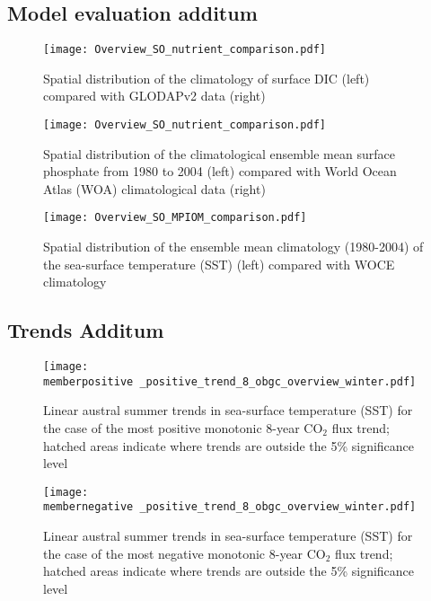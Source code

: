 \documentclass[12pt]{article}
\newcommand{\memberpositive}{m178_1985_1992} %
\newcommand{\membernegative}{m143_1995_2002}
\begin{document}
\clearpage
\subsection{Model evaluation additum}
\begin{figure}[h!]
	\centering
	\texttt{[image: Overview\_SO\_nutrient\_comparison.pdf]} %
	\caption{Spatial distribution of the climatology of surface DIC (left) compared with GLODAPv2 data \citep{WOA2013} (right)}
	\label{fig:SOCS_comp_DIC}
\end{figure}



\begin{figure}[h!]
	\centering
	\texttt{[image: Overview\_SO\_nutrient\_comparison.pdf]} %
	\caption{Spatial distribution of the climatological ensemble mean surface phosphate from 1980 to 2004 (left) compared with World Ocean Atlas (WOA) climatological data \citep{WOA2013} (right)}		
	\label{fig:SO_comp_phosph}
\end{figure}

\begin{figure}[h!]
	\centering
	\texttt{[image: Overview\_SO\_MPIOM\_comparison.pdf]} %
	\caption{Spatial distribution of the ensemble mean climatology (1980-2004) of the sea-surface temperature (SST) (left) compared with WOCE climatology}
	\label{fig:SO_comp_sst}
\end{figure}

\clearpage
\subsection{Trends Additum}
\begin{figure}[h!]
	\centering
	\texttt{[image: \\memberpositive \_positive\_trend\_8\_obgc\_overview\_winter.pdf]} %
	\caption{Linear austral summer trends in sea-surface temperature (SST) for the case of the most positive monotonic 8-year CO$_2$ flux trend; hatched areas indicate where trends are outside the 5\% significance level}
	\label{fig:sst_pos}
\end{figure}

\begin{figure}[h!]
	\centering
	\texttt{[image: \\membernegative \_positive\_trend\_8\_obgc\_overview\_winter.pdf]} %
	\caption{Linear austral summer trends in sea-surface temperature (SST) for the case of the most negative monotonic 8-year CO$_2$ flux trend; hatched areas indicate where trends are outside the 5\% significance level}
	\label{fig:sst_neg}
\end{figure}
\end{document}
